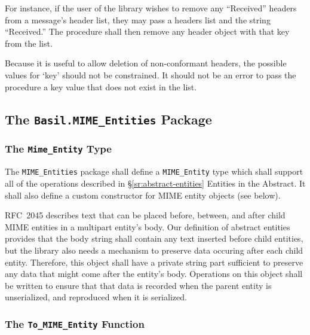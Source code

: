 \documentclass[11pt]{article}
\begin{document}
For instance, if the user of the library wishes to remove any
``Received'' headers from a message's header list, they may pass a
headers list and the string ``Received.'' The procedure shall then
remove any header object with that key from the list. 

Because it is useful to allow deletion of non-conformant headers, the
possible values for `key' should not be constrained. It should not be
an error to pass the procedure a key value that does not exist in the
list.




\subsection{The \texttt{Basil.MIME\_Entities} Package}

\subsubsection{The \texttt{Mime\_Entity} Type}
\label{sr:mime-entities:mime-entity}

The \texttt{MIME\_Entities} package shall define a
\texttt{MIME\_Entity} type which shall support all of the operations
described in \S\ref{sr:abstract-entities} Entities in the Abstract. It
shall also define a custom constructor for MIME entity objects (see
below).

RFC~2045 describes text that can be placed before, between, and after
child MIME entities in a multipart entity's body. Our definition of
abstract entities provides that the body string shall contain any text
inserted before child entities, but the library also needs a mechanism
to preserve data occuring after each child entity. Therefore, this
object shall have a private string part sufficient to preserve any
data that might come after the entity's body. Operations on this
object shall be written to ensure that that data is recorded when the
parent entity is unserialized, and reproduced when it is serialized.

\subsubsection{The \texttt{To\_MIME\_Entity} Function}
\end{document}
